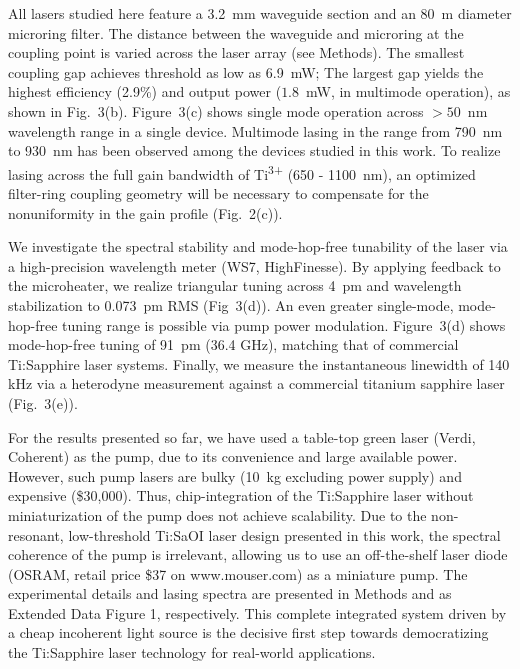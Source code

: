 \documentclass[amsmath, amsthm, amssymb, aps, prb, superscriptaddress, twocolumn, nofootinbib, 10pt]{revtex4-1}%
\begin{document}
All lasers studied here feature a 3.2~mm waveguide section and an 80~\textmu m diameter microring filter. The distance between the waveguide and microring at the coupling point is varied across the laser array (see Methods). The smallest coupling gap achieves threshold as low as 6.9~mW; The largest gap yields the highest efficiency (2.9\%) and output power ($1.8$~mW, in multimode operation), as shown in Fig.~3(b). Figure~3(c) shows single mode operation across $>50$~nm wavelength range in a single device. Multimode lasing in the range from 790~nm to 930~nm has been observed among the devices studied in this work. To realize lasing across the full gain bandwidth of Ti\textsuperscript{3+} (650 - 1100~nm), an optimized filter-ring coupling geometry
will be necessary to compensate for the nonuniformity in the gain profile (Fig.~2(c)).

We investigate the spectral stability and mode-hop-free tunability of the laser via a high-precision wavelength meter (WS7, HighFinesse). By applying feedback to the microheater, we realize triangular tuning across 4~pm and wavelength stabilization to 0.073~pm RMS (Fig~3(d)). An even greater single-mode, mode-hop-free tuning range is possible via pump power modulation. Figure~3(d) shows mode-hop-free tuning of 91~pm (36.4 GHz), matching that of commercial Ti:Sapphire laser systems. Finally, we measure the instantaneous linewidth of 140 kHz via a heterodyne measurement against a commercial titanium sapphire laser (Fig.~3(e)).

For the results presented so far, we have used a table-top green laser (Verdi, Coherent) as the pump, due to its convenience and large available power. However, such pump lasers are bulky (10~kg excluding power supply) and expensive (\$30,000). Thus, chip-integration of the Ti:Sapphire laser without miniaturization of the pump does not achieve scalability. Due to the non-resonant, low-threshold Ti:SaOI laser design presented in this work, the spectral coherence of the pump is irrelevant, allowing us to use an off-the-shelf laser diode (OSRAM, retail price \$37 on www.mouser.com) as a miniature pump. The experimental details and lasing spectra are presented in Methods and as Extended Data Figure 1, respectively. This complete integrated system driven by a cheap incoherent light source is the decisive first step towards democratizing the Ti:Sapphire laser technology for real-world applications.
%
%
\end{document}
